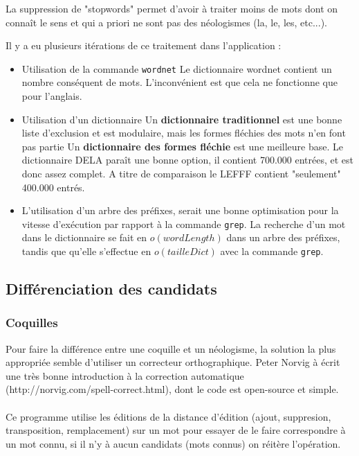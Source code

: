 \documentclass{article}
\begin{document}
La suppression de "stopwords" permet d'avoir à traiter moins de mots dont on connaît le sens et qui a priori ne sont pas des néologismes (la, le, les, etc...).

Il y a eu plusieurs itérations de ce traitement dans l'application :
\begin{itemize}
\item Utilisation de la commande \texttt{wordnet}\newline
Le dictionnaire wordnet contient un nombre conséquent de mots. L'inconvénient est que cela ne fonctionne que pour l'anglais.
\item Utilisation d'un dictionnaire\newline
Un \textbf{dictionnaire traditionnel} est une bonne liste d'exclusion et est modulaire, mais les formes fléchies des mots n'en font pas partie\newline
Un \textbf{dictionnaire des formes fléchie} est une meilleure base. Le dictionnaire DELA paraît une bonne option, il contient 700.000 entrées, et est donc assez complet. A titre de comparaison le LEFFF contient "seulement" 400.000 entrés.
\item L'utilisation d'un arbre des préfixes, serait une bonne optimisation pour la vitesse d’exécution par rapport à la commande \texttt{grep}. La recherche d'un mot dans le dictionnaire se fait en $o(wordLength)$ dans un arbre des préfixes, tandis que qu'elle s'effectue en $o(tailleDict)$ avec la commande \texttt{grep}.
\end{itemize}

\paragraph*{}

\subsection{Différenciation des candidats}

\subsubsection{Coquilles}

Pour faire la différence entre une coquille et un néologisme, la solution la plus appropriée semble d'utiliser un correcteur orthographique. Peter Norvig à écrit une très bonne introduction à la correction automatique (http://norvig.com/spell-correct.html), dont le code est open-source et simple.
\paragraph*{}
Ce programme utilise les éditions de la distance d'édition (ajout, suppresion, transposition, remplacement) sur un mot pour essayer de le faire correspondre à un mot connu, si il n'y à aucun candidats (mots connus) on réitère l'opération.
\end{document}
